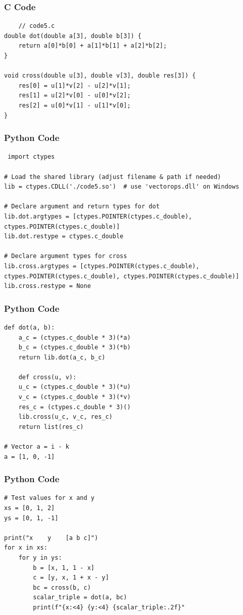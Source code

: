 \documentclass{beamer}
\begin{document}
\begin{frame}[fragile]
    \frametitle{C Code }
    \begin{lstlisting}
    // code5.c
double dot(double a[3], double b[3]) {
    return a[0]*b[0] + a[1]*b[1] + a[2]*b[2];
}

void cross(double u[3], double v[3], double res[3]) {
    res[0] = u[1]*v[2] - u[2]*v[1];
    res[1] = u[2]*v[0] - u[0]*v[2];
    res[2] = u[0]*v[1] - u[1]*v[0];
}
\end{lstlisting}
\end{frame}

\begin{frame}[fragile]
    \frametitle{Python Code }
    \begin{lstlisting}
 import ctypes

# Load the shared library (adjust filename & path if needed)
lib = ctypes.CDLL('./code5.so')  # use 'vectorops.dll' on Windows

# Declare argument and return types for dot
lib.dot.argtypes = [ctypes.POINTER(ctypes.c_double), ctypes.POINTER(ctypes.c_double)]
lib.dot.restype = ctypes.c_double

# Declare argument types for cross
lib.cross.argtypes = [ctypes.POINTER(ctypes.c_double), ctypes.POINTER(ctypes.c_double), ctypes.POINTER(ctypes.c_double)]
lib.cross.restype = None
\end{lstlisting}
\end{frame}

\begin{frame}[fragile]
    \frametitle{Python Code }
    \begin{lstlisting}
def dot(a, b):
    a_c = (ctypes.c_double * 3)(*a)
    b_c = (ctypes.c_double * 3)(*b)
    return lib.dot(a_c, b_c)

    def cross(u, v):
    u_c = (ctypes.c_double * 3)(*u)
    v_c = (ctypes.c_double * 3)(*v)
    res_c = (ctypes.c_double * 3)()
    lib.cross(u_c, v_c, res_c)
    return list(res_c)

# Vector a = i - k
a = [1, 0, -1]
\end{lstlisting}
\end{frame}

\begin{frame}[fragile]
    \frametitle{Python Code }
    \begin{lstlisting}
# Test values for x and y
xs = [0, 1, 2]
ys = [0, 1, -1]

print("x    y    [a b c]")
for x in xs:
    for y in ys:
        b = [x, 1, 1 - x]
        c = [y, x, 1 + x - y]
        bc = cross(b, c)
        scalar_triple = dot(a, bc)
        print(f"{x:<4} {y:<4} {scalar_triple:.2f}"
\end{lstlisting}
\end{frame}
 
\end{document}

